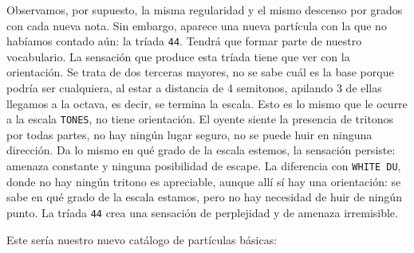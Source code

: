 \documentclass[]{report}
\begin{document}
Observamos, por supuesto, la misma regularidad y el mismo descenso por grados con cada nueva nota. Sin embargo, aparece una nueva partícula con la que no habíamos contado aún: la tríada \texttt{44}. Tendrá que formar parte de nuestro vocabulario. La sensación que produce esta tríada tiene que ver con la orientación. Se trata de dos terceras mayores, no se sabe cuál es la base porque podría ser cualquiera, al estar a distancia de 4 semitonos, apilando 3 de ellas llegamos a la octava, es decir, se termina la escala. Esto es lo mismo que le ocurre a la escala \texttt{TONES}, no tiene orientación. El oyente siente la presencia de tritonos por todas partes, no hay ningún lugar seguro, no se puede huir en ninguna dirección. Da lo mismo en qué grado de la escala estemos, la sensación persiste: amenaza constante y ninguna posibilidad de escape. La diferencia con \texttt{WHITE DU}, donde no hay ningún tritono es apreciable, aunque allí sí hay una orientación: se sabe en qué grado de la escala estamos, pero no hay necesidad de huir de ningún punto. La tríada \texttt{44} crea una sensación de perplejidad y de amenaza irremisible.

Este sería nuestro nuevo catálogo de partículas básicas:

\end{document}
